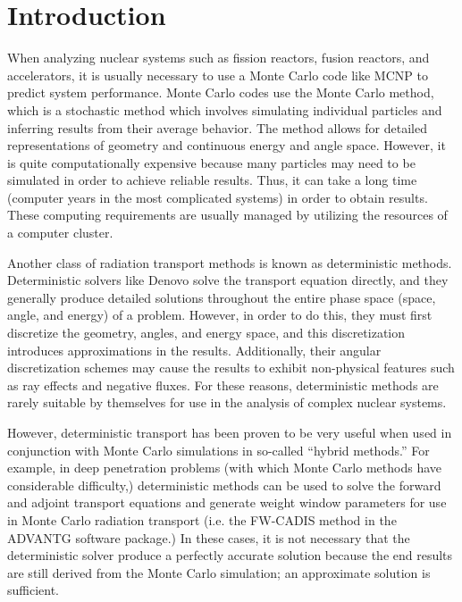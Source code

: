 \chapter{Introduction}
\label{chap:intro}

When analyzing nuclear systems such as fission reactors, fusion reactors, and accelerators, it is usually necessary to use a Monte Carlo code like MCNP \cite{mcnp620} to predict system performance.
Monte Carlo codes use the Monte Carlo method, which is a stochastic method which involves simulating individual particles and inferring results from their average behavior.
The method allows for detailed representations of geometry and continuous energy and angle space.
However, it is quite computationally expensive because many particles may need to be simulated in order to achieve reliable results.
Thus, it can take a long time (computer years in the most complicated systems) in order to obtain results.
These computing requirements are usually managed by utilizing the resources of a computer cluster.

Another class of radiation transport methods is known as deterministic methods.
Deterministic solvers like Denovo \cite{denovo} solve the transport equation directly, and they generally produce detailed solutions throughout the entire phase space (space, angle, and energy) of a problem.
However, in order to do this, they must first discretize the geometry, angles, and energy space, and this discretization introduces approximations in the results.
Additionally, their angular discretization schemes may cause the results to exhibit non-physical features such as ray effects and negative fluxes.
For these reasons, deterministic methods are rarely suitable by themselves for use in the analysis of complex nuclear systems.

However, deterministic transport has been proven to be very useful when used in conjunction with Monte Carlo simulations in so-called ``hybrid methods.''
For example, in deep penetration problems (with which Monte Carlo methods have considerable difficulty,) deterministic methods can be used to solve the forward and adjoint transport equations and generate weight window parameters for use in Monte Carlo radiation transport (i.e. the FW-CADIS method \cite{fwcadis} in the ADVANTG \cite{advantg} software package.)
In these cases, it is not necessary that the deterministic solver produce a perfectly accurate solution because the end results are still derived from the Monte Carlo simulation; an approximate solution is sufficient.

